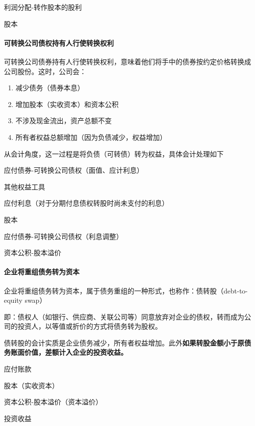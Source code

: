 \documentclass[UTF8,12pt]{ctexart}
\newenvironment{Dr}{%
	\begin{list}{}%
		{
			\setlength{\leftmargin}{2em}
			\setlength{\labelwidth}{2em}
			\setlength{\labelsep}{0pt}
			\setlength{\itemindent}{0pt}
			\setlength{\listparindent}{0pt}
			\setlength{\parsep}{0pt}
			\setlength{\topsep}{0pt}
		}
		\item[\textbf{借：}]
	}{%
	\end{list}
}
\newenvironment{Cr}{%
	\begin{list}{}%
		{
			\setlength{\leftmargin}{3em}
			\setlength{\labelwidth}{2em}
			\setlength{\labelsep}{0pt}
			\setlength{\itemindent}{0pt}
			\setlength{\listparindent}{0pt}
			\setlength{\parsep}{0pt}
			\setlength{\topsep}{0pt}
		}
		\item[\textbf{贷：}]
	}{%
	\end{list}
}
\numberwithin{equation}{section} %
\numberwithin{figure}{section}
\numberwithin{table}{section}
\begin{document}
	\begin{Dr}
		利润分配-转作股本的股利
	\end{Dr}
	\begin{Cr}
		股本
	\end{Cr}
	
	\paragraph{可转换公司债权持有人行使转换权利}
	可转换公司债券持有人行使转换权利，意味着他们将手中的债券按约定价格转换成公司股份。这时，公司会：
	\begin{enumerate}
		\item 减少债务（债券本息）
		
		\item 增加股本（实收资本）和资本公积
		
		\item 不涉及现金流出，资产总额不变
		
		\item 所有者权益总额增加（因为负债减少，权益增加）
	\end{enumerate}
	
	从会计角度，这一过程是将负债（可转债）转为权益，具体会计处理如下
	
	\begin{Dr}
		应付债券-可转换公司债权（面值、应计利息）
		
		其他权益工具
		
		应付利息（对于分期付息债权转股时尚未支付的利息）
	\end{Dr}
	\begin{Cr}
		股本
		
		应付债券-可转换公司债权（利息调整）
		
		资本公积-股本溢价
	\end{Cr}

	\paragraph{企业将重组债务转为资本}
	企业将重组债务转为资本，属于债务重组的一种形式，也称作：债转股（debt-to-equity swap）
	
	即：债权人（如银行、供应商、关联公司等）同意放弃对企业的债权，转而成为公司的投资人，以等值或折价的方式将债务转为股权。
	
	债转股的会计实质是企业债务减少，所有者权益增加。此外\textbf{如果转股金额小于原债务账面价值，差额计入企业的投资收益。}
	
	\begin{Dr}
		应付账款
	\end{Dr}
	\begin{Cr}
		股本（实收资本）
		
		资本公积-股本溢价（资本溢价）
		
		投资收益
	\end{Cr}
\end{document}
